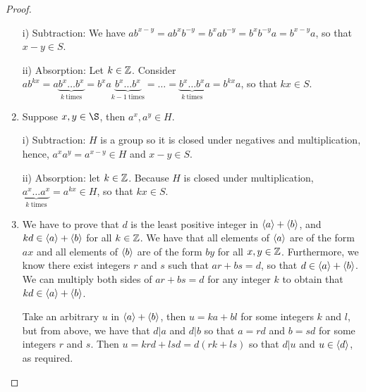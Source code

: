 \begin{proof}
\begin{enumerate}
    i) Subtraction: We have $ab^{x-y}=ab^{x}b^{-y}=b^{x}ab^{-y}=b^{x}b^{-y}a=b^{x-y}a$, so that $x-y\in S$.

    ii) Absorption: Let $k\in\mathbb{Z}$. Consider $ab^{kx}=a\underbrace{b^{x}\dots b^{x}}_{k\ \text{times}}=b^{x}a\underbrace{b^{x}\dots b^{x}}_{k-1\ \text{times}}=\dots=\underbrace{b^{x}\dots b^{x}}_{k\ \text{times}}a=b^{kx}a$, so that $kx\in S$.
    \item Suppose $x,y\in\S$, then $a^{x},a^{y}\in H$. 

    i) Subtraction: $H$ is a group so it is closed under negatives and multiplication, hence, $a^{x}a^{y}=a^{x-y}\in H$ and $x-y\in S$.

    ii) Absorption: let $k\in\mathbb{Z}$. Because $H$ is closed under multiplication, $\underbrace{a^{x}\dots a^{x}}_{k\ \text{times}}=a^{kx}\in H$, so that $kx\in S$.
    \item We have to prove that $d$ is the least positive integer in $\langle a\rangle+\langle b\rangle$, and $kd\in\langle a\rangle+\langle b\rangle$ for all $k\in\mathbb{Z}$. We have that all elements of $\langle a\rangle$ are of the form $ax$ and all elements of $\langle b\rangle$ are of the form $by$ for all $x,y\in\mathbb{Z}$. Furthermore, we know there exist integers $r$ and $s$ such that $ar+bs=d$, so that $d\in\langle a\rangle+\langle b\rangle$. We can multiply both sides of $ar+bs=d$ for any integer $k$ to obtain that $kd\in\langle a\rangle+\langle b\rangle$. 

    Take an arbitrary $u$ in $\langle a\rangle+\langle b\rangle$, then $u=ka+bl$ for some integers $k$ and $l$, but from above, we have that $d\vert a$ and $d\vert b$ so that $a=rd$ and $b=sd$ for some integers $r$ and $s$. Then $u=krd+lsd=d(rk+ls)$ so that $d\vert u$ and $u\in\langle d\rangle$, as required.
\end{enumerate}
\end{proof}